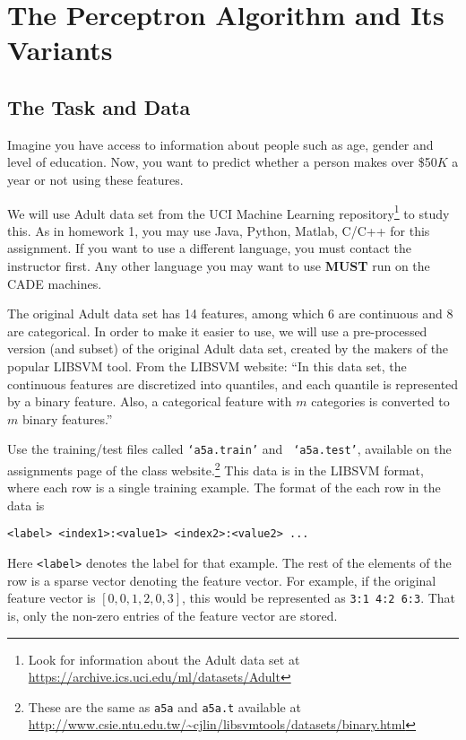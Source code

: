 \section{The Perceptron Algorithm and Its Variants}

\subsection{The Task and Data}
Imagine you have access to information about people such as age,
gender and level of education. Now, you want to predict whether a
person makes over \$50$K$ a year or not using these features.

We will use Adult data set from the UCI Machine Learning
repository\footnote{Look for information about the Adult data set at
  \url{https://archive.ics.uci.edu/ml/datasets/Adult}} to study this.
%
As in homework 1, you may use Java, Python, Matlab, C/C++ for this
assignment. If you want to use a different language, you must contact
the instructor first. Any other language you may want to use
\textbf{MUST} run on the CADE machines.

The original Adult data set has 14 features, among which 6 are
continuous and 8 are categorical. In order to make it easier to use,
we will use a pre-processed version (and subset) of the original Adult
data set, created by the makers of the popular LIBSVM tool. From the
LIBSVM website: ``In this data set, the continuous features are
discretized into quantiles, and each quantile is represented by a
binary feature. Also, a categorical feature with $m$ categories is
converted to $m$ binary features.''

Use the training/test files called {\tt `a5a.train'} and {\tt
  `a5a.test'}, available on the assignments page of the class
website.\footnote{These are the same as {\tt a5a} and {\tt a5a.t}
  available at
  \url{http://www.csie.ntu.edu.tw/~cjlin/libsvmtools/datasets/binary.html}}
This data is in the LIBSVM format, where each row is a single training
example. The format of the each row in the data is

{\tt <label> <index1>:<value1> <index2>:<value2> ...}

Here {\tt <label>} denotes the label for that example. The rest of the
elements of the row is a sparse vector denoting the feature vector.
For example, if the original feature vector is $[0, 0, 1, 2, 0, 3]$,
this would be represented as {\tt 3:1 4:2 6:3}. That is, only the
non-zero entries of the feature vector are stored.

